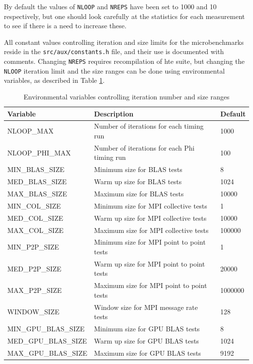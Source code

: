 \documentclass[10pt,a4paper]{report}
\begin{document}
By default the values of \verb+NLOOP+ and \verb+NREPS+ have been set to 1000 and 10 respectively, but one should look carefully at the statistics for each measurement to see if there is a need to increase these.

All constant values controlling iteration and size limits for the microbenchmarks reside in the \texttt{src/aux/constants.h} file, and their use is documented with comments. Changing \verb+NREPS+ requires recompilation of hte suite, but changing the \verb+NLOOP+ iteration limit and the size ranges can be done using environmental variables, as described in Table \ref{tab:env}.

\begin{table}[ht]
\centering
\caption{Environmental variables controlling iteration number and size ranges}
\label{tab:env}
\begin{tabular}{|l|l|l|}
\hline
\bf{Variable}	& \bf{Description}                          & \bf{Default}\\\hline
NLOOP\_MAX      & Number of iterations for each timing run  & 1000\\
NLOOP\_PHI\_MAX & Number of iterations for each Phi timing run  & 100\\
MIN\_BLAS\_SIZE & Minimum size for BLAS tests               & 8\\
MED\_BLAS\_SIZE & Warm up size for BLAS tests               & 1024\\
MAX\_BLAS\_SIZE & Maximum size for BLAS tests               & 10000\\
MIN\_COL\_SIZE  & Minimum size for MPI collective tests     & 1\\
MED\_COL\_SIZE  & Warm up size for MPI collective tests     & 10000\\
MAX\_COL\_SIZE  & Maximum size for MPI collective tests     & 100000\\
MIN\_P2P\_SIZE  & Minimum size for MPI point to point tests & 1\\
MED\_P2P\_SIZE  & Warm up size for MPI point to point tests & 20000\\
MAX\_P2P\_SIZE  & Maximum size for MPI point to point tests & 1000000\\
WINDOW\_SIZE    & Window size for MPI message rate tests    & 128\\
MIN\_GPU\_BLAS\_SIZE & Minimum size for GPU BLAS tests      & 8\\
MED\_GPU\_BLAS\_SIZE & Warm up size for GPU BLAS tests      & 1024\\
MAX\_GPU\_BLAS\_SIZE & Maximum size for GPU BLAS tests      & 9192\\

\end{tabular}
\end{table}
\end{document}
